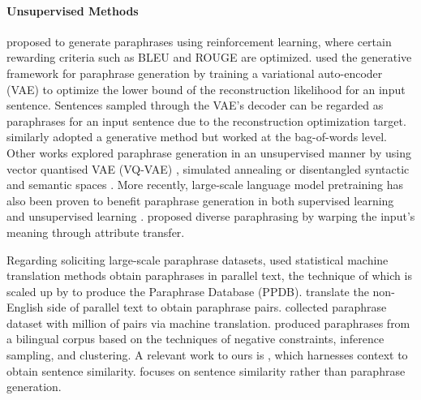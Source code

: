 \documentclass[11pt,a4paper]{article}
\begin{document}
\paragraph{Unsupervised Methods}
\citet{li-etal-2018-paraphrase,Siddique_2020} proposed to generate paraphrases using reinforcement learning, where certain rewarding criteria such as BLEU and ROUGE are optimized.
\citet{bowman-etal-2016-generating,yang2019end} used the generative framework for paraphrase generation by training a variational auto-encoder (VAE) \citep{kingma2013auto} to optimize the lower bound of the reconstruction likelihood for an input sentence. Sentences sampled through the VAE's decoder can be regarded as paraphrases for an input sentence due to the reconstruction optimization target.
\citet{fu2019paraphrase} similarly adopted a generative method but worked at the bag-of-words level.
Other works explored paraphrase generation in an unsupervised manner by using vector quantised VAE (VQ-VAE) \citep{roy2019unsupervised}, simulated annealing \citep{liu2019unsupervised} or disentangled syntactic and semantic spaces \citep{bao-etal-2019-generating}. 
More recently, large-scale language model pretraining has also been proven to benefit paraphrase generation in  both supervised learning \citep{witteveen2019paraphrasing} and unsupervised learning \citep{hegde2020unsupervised}.
proposed diverse paraphrasing
by warping
the input’s meaning through attribute transfer. 

Regarding soliciting large-scale paraphrase datasets,
used statistical machine translation
methods  
obtain  paraphrases in parallel
text, the technique of which is scaled up by 
to
produce the Paraphrase Database
(PPDB). 
 translate the non-English side of parallel text to obtain paraphrase pairs. 
 collected paraphrase dataset with million of pairs via machine translation. 
produced paraphrases from a bilingual corpus based on the techniques of negative constraints, inference sampling, and clustering. 
A relevant work to ours is , which harnesses context  to obtain sentence similarity.
 focuses on sentence
similarity rather than paraphrase generation. 
\end{document}

